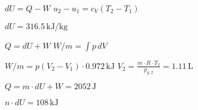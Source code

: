 \( dU = Q - W \)  
\( u_2 - u_1 = c_V (T_2 - T_1) \)  

\( dU = 316.5 \, \text{kJ/kg} \)  

\( Q = dU + W \)  
\( W/m = \int p \, dV \)  

\( W/m = p (V_2 - V_1) \cdot 0.972 \, \text{kJ} \)  
\( V_2 = \frac{m \cdot R \cdot T_2}{p_{g,2}} = 1.11 \, \text{L} \)  

\( Q = m \cdot dU + W = 2052 \, \text{J} \)  

\( n \cdot dU = 108 \, \text{kJ} \)